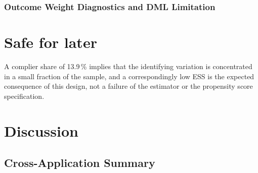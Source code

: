 \documentclass[12pt, a4paper, oneside]{article}
\theoremstyle{plain}
\theoremstyle{definition}
\begin{document}

\subsubsection{Outcome Weight Diagnostics and DML Limitation}



\section{Safe for later}
A complier share of 13.9\,\% implies that the
identifying variation is concentrated in a small fraction of the sample,
and a correspondingly low ESS is the expected consequence of this design,
not a failure of the estimator or the propensity score specification.

\section{Discussion}
\label{sec:discussion}

\subsection{Cross-Application Summary}
\label{subsec:cross_application}
\end{document}
